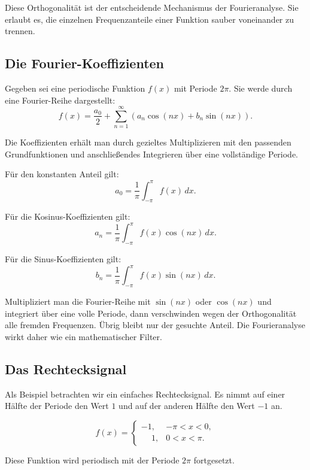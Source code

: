 Diese Orthogonalität ist der entscheidende Mechanismus der Fourieranalyse.
Sie erlaubt es, die einzelnen Frequenzanteile einer Funktion sauber voneinander zu trennen.

\subsection{Die Fourier-Koeffizienten}

Gegeben sei eine periodische Funktion \(f(x)\) mit Periode \(2\pi\).
Sie werde durch eine Fourier-Reihe dargestellt:
\[
f(x)=\frac{a_0}{2}
+\sum_{n=1}^{\infty}
\left(a_n\cos(nx)+b_n\sin(nx)\right).
\]

Die Koeffizienten erhält man durch gezieltes Multiplizieren mit den passenden Grundfunktionen
und anschließendes Integrieren über eine vollständige Periode.

Für den konstanten Anteil gilt:
\[
a_0=\frac{1}{\pi}\int_{-\pi}^{\pi}f(x)\,dx.
\]

Für die Kosinus-Koeffizienten gilt:
\[
a_n=\frac{1}{\pi}\int_{-\pi}^{\pi}f(x)\cos(nx)\,dx.
\]

Für die Sinus-Koeffizienten gilt:
\[
b_n=\frac{1}{\pi}\int_{-\pi}^{\pi}f(x)\sin(nx)\,dx.
\]

\begin{DidacticBox}
	\label{box:anhangA-fourier-koeffizienten}
	\small
	Multipliziert man die Fourier-Reihe mit \(\sin(nx)\) oder \(\cos(nx)\)
	und integriert über eine volle Periode,
	dann verschwinden wegen der Orthogonalität alle fremden Frequenzen.
	Übrig bleibt nur der gesuchte Anteil.
	Die Fourieranalyse wirkt daher wie ein mathematischer Filter.
\end{DidacticBox}

\subsection{Das Rechtecksignal}

Als Beispiel betrachten wir ein einfaches Rechtecksignal.
Es nimmt auf einer Hälfte der Periode den Wert \(1\) und auf der anderen Hälfte den Wert \(-1\) an.

\[
f(x)=
\begin{cases}
	-1, & -\pi < x < 0,\\
	\phantom{-}1, & 0 < x < \pi.
\end{cases}
\]

Diese Funktion wird periodisch mit der Periode \(2\pi\) fortgesetzt.

